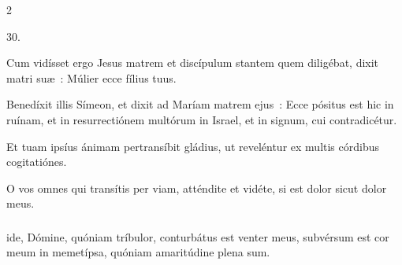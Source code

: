 \documentclass[9pt,twoside]{extarticle}
\begin{document}
\begin{multicols}{2}
\begin{tightlist}{}
\item {} 30.
\item {} Cum vidísset ergo Jesus matrem et discípulum stantem quem diligébat, dixit matri suæ~: Múlier ecce fílius tuus.
\item {} Benedíxit illis Símeon, et dixit ad Maríam matrem ejus~: Ecce pósitus est hic in ruínam, et in resurrectiónem multórum in Israel, et in signum, cui contradicétur.
\item {} Et tuam ipsíus ánimam pertransíbit gládius, ut reveléntur ex multis córdibus cogitatiónes.
\item {} O vos omnes qui transítis per viam, atténdite et vidéte, si est dolor sicut dolor meus.
\end{tightlist}

\subsubsection*{}
ide, Dómine, quóniam tríbulor, conturbátus est venter meus, subvérsum est cor meum in memetípsa, quóniam amaritúdine plena sum.


\end{multicols}
\end{document}

